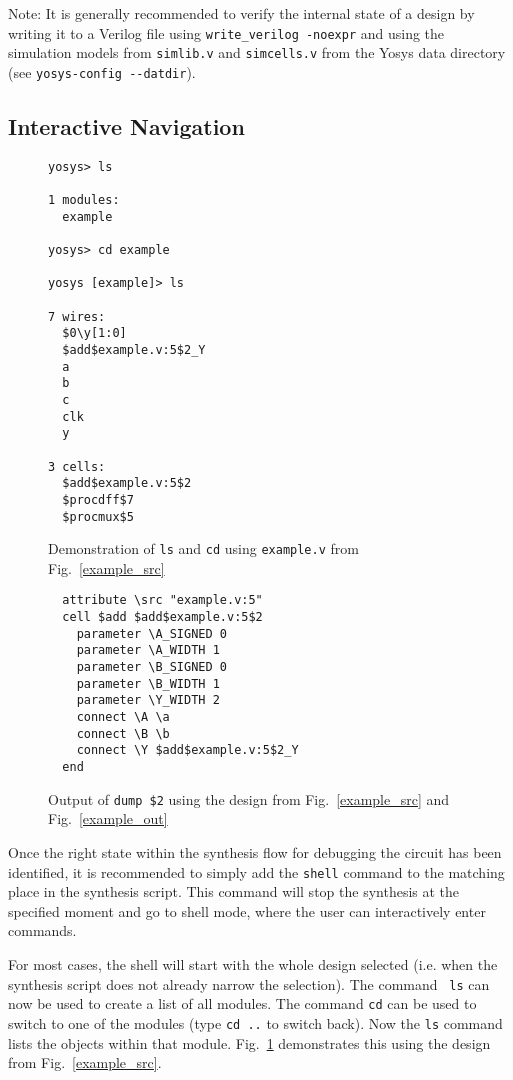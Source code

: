 \documentclass[9pt,technote,a4paper]{IEEEtran}
\begin{document}
\medskip

Note: It is generally recommended to verify the internal state of a design by
writing it to a Verilog file using {\tt write\_verilog -noexpr} and using the
simulation models from {\tt simlib.v} and {\tt simcells.v} from the Yosys data
directory (see {\tt yosys-config -{}-datdir}).

\subsection{Interactive Navigation}

\begin{figure}
\begin{lstlisting}
yosys> ls

1 modules:
  example

yosys> cd example 

yosys [example]> ls

7 wires:
  $0\y[1:0]
  $add$example.v:5$2_Y
  a
  b
  c
  clk
  y

3 cells:
  $add$example.v:5$2
  $procdff$7
  $procmux$5
\end{lstlisting}
\caption{Demonstration of {\tt ls} and {\tt cd} using {\tt example.v} from Fig.~\ref{example_src}}
\label{lscd}
\end{figure}

\begin{figure}[b]
\begin{lstlisting}
  attribute \src "example.v:5"
  cell $add $add$example.v:5$2
    parameter \A_SIGNED 0
    parameter \A_WIDTH 1
    parameter \B_SIGNED 0
    parameter \B_WIDTH 1
    parameter \Y_WIDTH 2
    connect \A \a
    connect \B \b
    connect \Y $add$example.v:5$2_Y
  end
\end{lstlisting}
\caption{Output of {\tt dump \$2} using the design from Fig.~\ref{example_src} and  Fig.~\ref{example_out}}
\label{dump2}
\end{figure}

Once the right state within the synthesis flow for debugging the circuit has
been identified, it is recommended to simply add the {\tt shell} command
to the matching place in the synthesis script. This command will stop the
synthesis at the specified moment and go to shell mode, where the user can
interactively enter commands.

For most cases, the shell will start with the whole design selected (i.e.  when
the synthesis script does not already narrow the selection). The command {\tt
ls} can now be used to create a list of all modules. The command {\tt cd} can
be used to switch to one of the modules (type {\tt cd ..} to switch back). Now
the {\tt ls} command lists the objects within that module. Fig.~\ref{lscd}
demonstrates this using the design from Fig.~\ref{example_src}.
\end{document}
